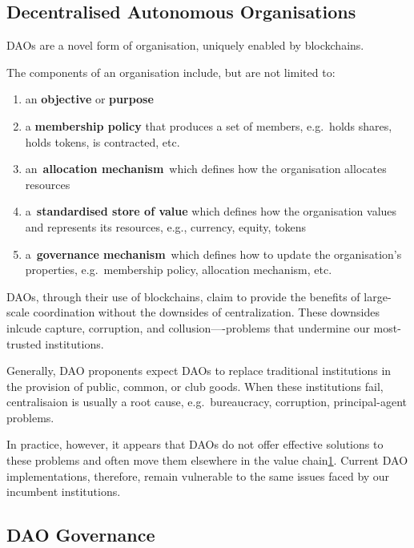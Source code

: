 \documentclass[
]{article}
\providecommand{\tightlist}{%
  \setlength{\itemsep}{0pt}\setlength{\parskip}{0pt}}
\begin{document}
\hypertarget{decentralised-autonomous-organisations}{%
\subsection{Decentralised Autonomous
Organisations}\label{decentralised-autonomous-organisations}}

DAOs are a novel form of organisation, uniquely enabled by blockchains.

The components of an organisation include, but are not limited to:

\begin{enumerate}
\def\labelenumi{\arabic{enumi}.}
\tightlist
\item
  an \textbf{objective} or \textbf{purpose}
\item
  a \textbf{membership policy} that produces a set of members,
  e.g.~holds shares, holds tokens, is contracted, etc.
\item
  an~\textbf{allocation mechanism}~which defines how the organisation
  allocates resources
\item
  a~\textbf{standardised store of value} which defines how the
  organisation values and represents its resources, e.g., currency,
  equity, tokens
\item
  a~\textbf{governance mechanism}~which defines how to update the
  organisation's properties, e.g.~membership policy, allocation
  mechanism, etc.
\end{enumerate}

DAOs, through their use of blockchains, claim to provide the benefits of
large-scale coordination without the downsides of centralization. These
downsides inlcude capture, corruption, and collusion----problems that
undermine our most-trusted institutions.

Generally, DAO proponents expect DAOs to replace traditional
institutions in the provision of public, common, or club goods. When
these institutions fail, centralisaion is usually a root cause,
e.g.~bureaucracy, corruption, principal-agent problems.

In practice, however, it appears that DAOs do not offer effective
solutions to these problems and often move them elsewhere in the value
chain\href{https://kelsienabben.substack.com/p/towards-a-model-of-resilience-in}{1}.
Current DAO implementations, therefore, remain vulnerable to the same
issues faced by our incumbent institutions.

\hypertarget{dao-governance}{%
\subsection{DAO Governance}\label{dao-governance}}
\end{document}

